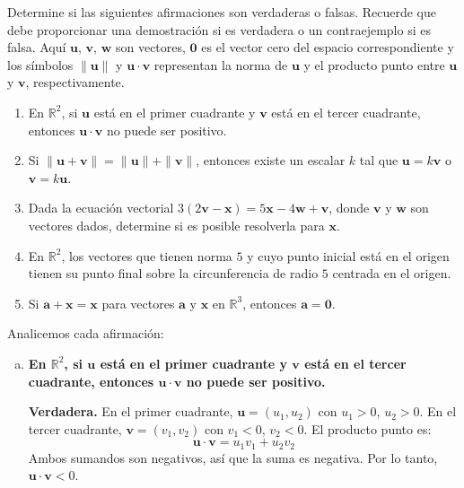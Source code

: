 \begin{prob} Determine si las siguientes afirmaciones son verdaderas o falsas. Recuerde que debe proporcionar una demostración si es verdadera o un contraejemplo si es falsa. Aquí $\mathbf{u}$, $\mathbf{v}$, $\mathbf{w}$ son vectores, $\mathbf{0}$ es el vector cero del espacio correspondiente y los símbolos $\|\mathbf{u}\|$ y $\mathbf{u} \cdot \mathbf{v}$ representan la norma de $\mathbf{u}$ y el producto punto entre $\mathbf{u}$ y $\mathbf{v}$, respectivamente.
\begin{enumerate}[$a)$]
 \item En $\mathbb{R}^2$, si $\mathbf{u}$ está en el primer cuadrante y $\mathbf{v}$ está en el tercer cuadrante, entonces $\mathbf{u} \cdot \mathbf{v}$ no puede ser positivo.
\item Si $\|\mathbf{u}+\mathbf{v}\|=\|\mathbf{u}\|+\|\mathbf{v}\|$, entonces existe un escalar $k$ tal que $\mathbf{u}=k\mathbf{v}$ o $\mathbf{v}=k\mathbf{u}$.
\item Dada la ecuación vectorial $3(2\mathbf{v}-\mathbf{x})=5\mathbf{x}-4\mathbf{w}+\mathbf{v}$, donde $\mathbf{v}$ y $\mathbf{w}$ son vectores dados, determine si es posible resolverla para $\mathbf{x}$.
\item En $\mathbb{R}^2$, los vectores que tienen norma $5$ y cuyo punto inicial está en el origen tienen su punto final sobre la circunferencia de radio $5$ centrada en el origen.
\item Si $\mathbf{a}+\mathbf{x}=\mathbf{x}$ para vectores $\mathbf{a}$ y $\mathbf{x}$ en $\mathbb{R}^3$, entonces $\mathbf{a}=\mathbf{0}$.
\end{enumerate}
\begin{myproof}
Analicemos cada afirmación:

\begin{enumerate}[a)]
\item \textbf{En $\mathbb{R}^2$, si $\mathbf{u}$ está en el primer cuadrante y $\mathbf{v}$ está en el tercer cuadrante, entonces $\mathbf{u} \cdot \mathbf{v}$ no puede ser positivo.}

\textbf{Verdadera.}  
En el primer cuadrante, $\mathbf{u} = (u_1, u_2)$ con $u_1 > 0$, $u_2 > 0$.  
En el tercer cuadrante, $\mathbf{v} = (v_1, v_2)$ con $v_1 < 0$, $v_2 < 0$.  
El producto punto es:
\[
\mathbf{u} \cdot \mathbf{v} = u_1 v_1 + u_2 v_2
\]
Ambos sumandos son negativos, así que la suma es negativa.  
Por lo tanto, $\mathbf{u} \cdot \mathbf{v} < 0$.

\vspace{1em}


\end{enumerate}
\end{myproof}
\end{prob}
